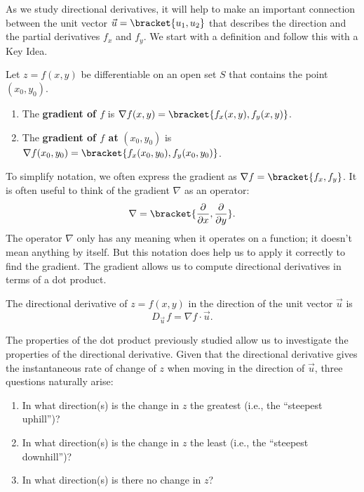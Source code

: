 As we study directional derivatives, it will help to make an important connection between the unit vector $\vec u =\bracket{u_1,u_2}$ that describes the direction and the partial derivatives $f_x$ and $f_y$. We start with a definition and follow this with a Key Idea.

{Let $z=f(x,y)$ be differentiable on an open set $S$ that contains the point $(x_0,y_0)$.
\begin{enumerate}
	\item The \textbf{gradient of $f$} is $\nabla f(x,y) =\bracket{f_x(x,y),f_y(x,y)}$.
	\item The \textbf{gradient of $f$ at} $(x_0,y_0)$ is $\nabla f(x_0,y_0) =\bracket{f_x(x_0,y_0),f_y(x_0,y_0)}$.
\end{enumerate}
}


To simplify notation, we often express the gradient as $\nabla f =\bracket{f_x, f_y}$. It is often useful to think of the gradient $\nabla$ as an operator:
\[\nabla=\bracket{\frac\partial{\partial x},\frac\partial{\partial y}}.\]
The operator $\nabla$ only has any meaning when it operates on a function; it doesn't mean anything by itself.  But this notation does help us to apply it correctly to find the gradient. The gradient allows us to compute directional derivatives in terms of a dot product.

{%
The directional derivative of $z=f(x,y)$ in the direction of the unit vector $\vec u$ is
\[D_{\vec u\,}f = \nabla f\cdot \vec u.\]}

The properties of the dot product previously studied allow us to investigate the properties of the directional derivative. Given that the directional derivative gives the instantaneous rate of change of $z$ when moving in the direction of $\vec u$, three questions naturally arise:
\begin{enumerate}
	\item In what direction(s) is the change in $z$ the greatest (i.e., the ``steepest uphill'')?
	\item In what direction(s) is the change in $z$ the least (i.e.,  the ``steepest downhill'')?
	\item In what direction(s) is there no change in $z$?
\end{enumerate}

